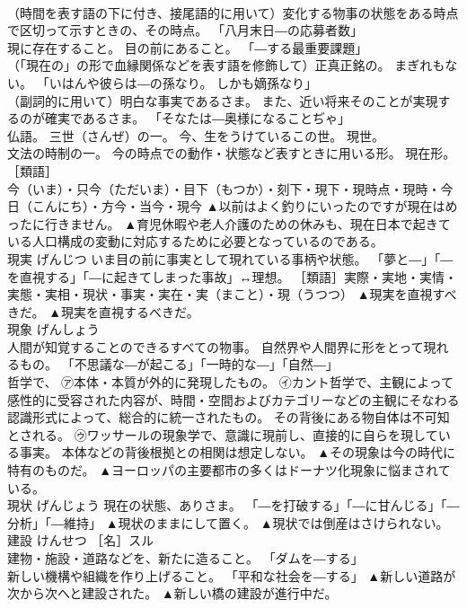 \documentclass[8pt]{extreport}
\begin{document}
\begin{CJK}{UTF8}{min}
\\	（時間を表す語の下に付き、接尾語的に用いて）変化する物事の状態をある時点で区切って示すときの、その時点。 「八月末日―の応募者数」 
\\	現に存在すること。 目の前にあること。 「―する最重要課題」 
\\	（「現在の」の形で血縁関係などを表す語を修飾して）正真正銘の。 まぎれもない。 「いはんや彼らは―の孫なり。 しかも嫡孫なり」 
\\	（副詞的に用いて）明白な事実であるさま。 また、近い将来そのことが実現するのが確実であるさま。 「そなたは―奥様になることぢゃ」 
\\	仏語。 三世（さんぜ）の一。 今、生をうけているこの世。 現世。 
\\	文法の時制の一。 今の時点での動作・状態など表すときに用いる形。 現在形。 ［類語］
\\	今（いま）・只今（ただいま）・目下（もつか）・刻下・現下・現時点・現時・今日（こんにち）・方今・当今・現今	▲以前はよく釣りにいったのですが現在はめったに行きません。 ▲育児休暇や老人介護のための休みも、現在日本で起きている人口構成の変動に対応するために必要となっているのである。
\\	現実	げんじつ	いま目の前に事実として現れている事柄や状態。 「夢と―」「―を直視する」「―に起きてしまった事故」↔理想。 ［類語］実際・実地・実情・実態・実相・現状・事実・実在・実（まこと）・現（うつつ）	▲現実を直視すべきだ。 ▲現実を直視するべきだ。
\\	現象	げんしょう	
\\	人間が知覚することのできるすべての物事。 自然界や人間界に形をとって現れるもの。 「不思議な―が起こる」「一時的な―」「自然―」 
\\	哲学で、 ㋐本体・本質が外的に発現したもの。 ㋑カント哲学で、主観によって感性的に受容された内容が、時間・空間およびカテゴリーなどの主観にそなわる認識形式によって、総合的に統一されたもの。 その背後にある物自体は不可知とされる。 ㋒ワッサールの現象学で、意識に現前し、直接的に自らを現している事実。 本体などの背後根拠との相関は想定しない。	▲その現象は今の時代に特有のものだ。 ▲ヨーロッパの主要都市の多くはドーナツ化現象に悩まされている。
\\	現状	げんじょう	現在の状態、ありさま。 「―を打破する」「―に甘んじる」「―分析」「―維持」	▲現状のままにして置く。 ▲現状では倒産はさけられない。
\\	建設	けんせつ	［名］スル 
\\	建物・施設・道路などを、新たに造ること。 「ダムを―する」 
\\	新しい機構や組織を作り上げること。 「平和な社会を―する」	▲新しい道路が次から次へと建設された。 ▲新しい橋の建設が進行中だ。

\end{CJK}
\end{document}
